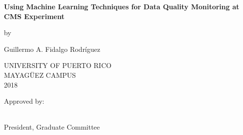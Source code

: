 \begin{titlepage}
    \begin{center}
    
        \vspace*{1cm}
      \Large  
        \textbf{Using Machine Learning Techniques for Data Quality Monitoring at CMS Experiment}
        
        \vspace{0.75cm}
        by
        
        \vspace{1.95cm}
        
        Guillermo A. Fidalgo Rodríguez         
        \vspace{2.5cm}	
        
        UNIVERSITY OF PUERTO RICO\\
        MAYAGÜEZ CAMPUS\\
        2018
        \vspace{5.8cm}
        
        \end{center}
        
        Approved by:
        
        \vspace{1.0cm}

\\President, Graduate Committee

%
%
%
%
%



\end{titlepage}